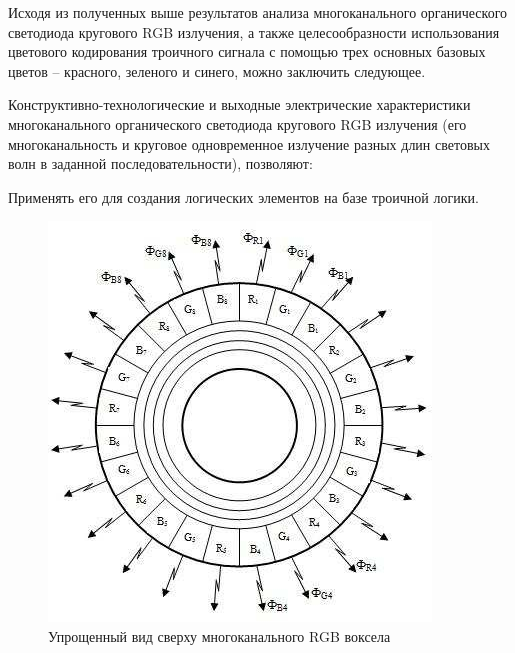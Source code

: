 \documentclass[10pt]{beamer}
\begin{document}
\begin{frame}[shrink=20,fragile]
\transdissolve[duration=0.2]
\begin{block}{}
	Исходя из полученных выше результатов анализа многоканального органического светодиода кругового RGB излучения, а также целесообразности использования цветового кодирования троичного сигнала с помощью трех основных базовых цветов – красного, зеленого и синего, можно заключить следующее.
	
	Конструктивно-технологические и выходные электрические характеристики многоканального органического светодиода кругового RGB излучения (его многоканальность и круговое одновременное излучение разных длин световых волн в заданной последовательности), позволяют:
	
	Применять его для создания логических элементов на базе троичной логики.
	\begin{figure}
	\label{fig5}
	\includegraphics[scale=0.85]{pics/5.jpeg}
	\caption{Упрощенный вид сверху многоканального RGB воксела}
	\end{figure}
\end{block}   
\end{frame}
\end{document}
